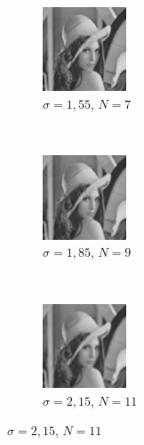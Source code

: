 \begin{frame}
\begin{figure}[h]
\begin{center}
			\begin{subfigure}[b]{3.5cm}
				\centering
				\includegraphics[width=2.5cm]{Lena_scales4.jpg}
				\caption{$\sigma = 1,55$, $N = 7$}
			\end{subfigure}
			~
			\begin{subfigure}[b]{3.5cm}
				\centering
				\includegraphics[width=2.5cm]{Lena_scales5.jpg}
				\caption{$\sigma = 1,85$, $N = 9$}
			\end{subfigure}
			~
			\begin{subfigure}[b]{3.5cm}
				\centering
				\includegraphics[width=2.5cm]{Lena_scales6.jpg}
				\caption{$\sigma = 2,15$, $N = 11$}
			\end{subfigure}
			\label{lena_scales}
		\end{center}
		\label{fig:as}
	\end{figure}
\end{frame}


